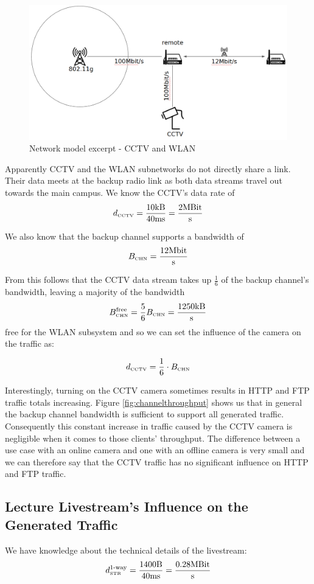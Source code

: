 \documentclass[a4paper]{scrreprt}
\begin{document}
			\begin{figure}[H]
				\center\includegraphics[width=\textwidth]{./simmodel_cctv_vs_wlan.png}
				\caption{Network model excerpt - CCTV and WLAN}
			\end{figure}
			
			Apparently CCTV and the WLAN subnetworks do not directly share a link. Their data meets at the backup radio link as both data streams travel out towards the main campus. We know the CCTV's data rate of  
			\[d_\text{\tiny CCTV}=\frac{10\text{kB}}{40\text{ms}}=\frac{2\text{MBit}}{\text{s}}\]
			
			We also know that the backup channel supports a bandwidth of \[B_\text{\tiny CHN}=\frac{12\text{Mbit}}{\text{s}}\]
			
			From this follows that the CCTV data stream takes up $\frac{1}{6}$ of the backup channel's bandwidth, leaving a majority of the bandwidth \[B_\text{\tiny CHN}^\text{free}=\frac{5}{6} B_\text{\tiny CHN}=\frac{1250\text{kB}}{\text{s}}\] free for the WLAN subsystem and so we can set the influence of the camera on the traffic as:
			
			\[d_\text{\tiny CCTV}=\frac{1}{6}\cdot B_\text{\tiny CHN}\]
			
			Interestingly, turning on the CCTV camera sometimes results in HTTP and FTP traffic totals increasing. Figure \ref{fig:channelthroughput} shows us that in general the backup channel bandwidth is sufficient to support all generated traffic. Consequently this constant increase in traffic caused by the CCTV camera is negligible when it comes to those clients' throughput. The difference between a use case with an online camera and one with an offline camera is very small and we can therefore say that the CCTV traffic has no significant influence on HTTP and FTP traffic.
		
			\subsection{Lecture Livestream's Influence on the Generated Traffic}
			We have knowledge about the technical details of the livestream: 
		\[d_\text{\tiny STR}^\text{1-way}=\frac{1400\text{B}}{40\text{ms}}=\frac{0.28\text{MBit}}{\text{s}}\]
		
\end{document}
